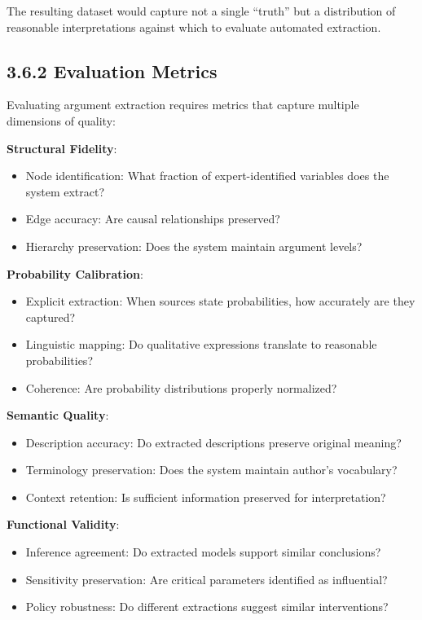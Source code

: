 \documentclass[
  11pt,
  letterpaper,
]{book}
\providecommand{\tightlist}{%
  \setlength{\itemsep}{0pt}\setlength{\parskip}{0pt}}
\begin{document}
The resulting dataset would capture not a single ``truth'' but a
distribution of reasonable interpretations against which to evaluate
automated extraction.

\subsection{3.6.2 Evaluation Metrics}\label{sec-evaluation-metrics}

Evaluating argument extraction requires metrics that capture multiple
dimensions of quality:

\textbf{Structural Fidelity}:

\begin{itemize}
\tightlist
\item
  Node identification: What fraction of expert-identified variables does
  the system extract?
\item
  Edge accuracy: Are causal relationships preserved?
\item
  Hierarchy preservation: Does the system maintain argument levels?
\end{itemize}

\textbf{Probability Calibration}:

\begin{itemize}
\tightlist
\item
  Explicit extraction: When sources state probabilities, how accurately
  are they captured?
\item
  Linguistic mapping: Do qualitative expressions translate to reasonable
  probabilities?
\item
  Coherence: Are probability distributions properly normalized?
\end{itemize}

\textbf{Semantic Quality}:

\begin{itemize}
\tightlist
\item
  Description accuracy: Do extracted descriptions preserve original
  meaning?
\item
  Terminology preservation: Does the system maintain author's
  vocabulary?
\item
  Context retention: Is sufficient information preserved for
  interpretation?
\end{itemize}

\textbf{Functional Validity}:

\begin{itemize}
\tightlist
\item
  Inference agreement: Do extracted models support similar conclusions?
\item
  Sensitivity preservation: Are critical parameters identified as
  influential?
\item
  Policy robustness: Do different extractions suggest similar
  interventions?
\end{itemize}
\end{document}

